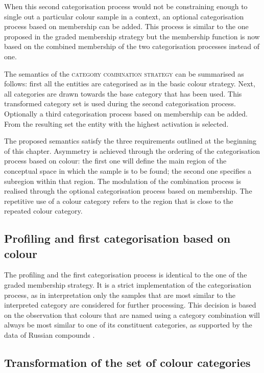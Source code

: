 When this second categorisation process would not be constraining
enough to single out a particular colour sample in a context, an
optional categorisation process based on membership can be added.
This process is similar to the one proposed in the graded
  membership strategy but the membership function is now based on the
combined membership of the two categorisation processes instead of
one.

The semantics of the \textsc{category combination strategy} can be
summarised as follows: first all the entities are categorised as in
the basic colour strategy. Next, all categories are drawn
towards the base category that has been used. This transformed
category set is used during the second categorisation
process. Optionally a third categorisation process based on membership
can be added. From the resulting set the entity with the highest
activation is selected.

The proposed semantics satisfy the three requirements outlined at
the beginning of this chapter. Asymmetry is achieved through the
ordering of the categorisation process based on colour: the first one
will define the main region of the conceptual space in which the
sample is to be found; the second one specifies a subregion within
that region. The modulation of the combination process is realised
through the optional categorisation process based on membership. The
repetitive use of a colour category refers to the region that is close
to the repeated colour category.

\subsection{Profiling and first categorisation based on colour}

The profiling and the first categorisation process is identical to the
one of the graded membership strategy. It is a strict
implementation of the categorisation process, as in interpretation
only the samples that are most similar to the interpreted category are
considered for further processing. This decision is based on the
observation that colours that are named using a category combination
will always be most similar to one of its constituent categories, as
supported by the data of Russian compounds \citep{safuanova07russian}.

\subsection{Transformation of the set of colour categories}

